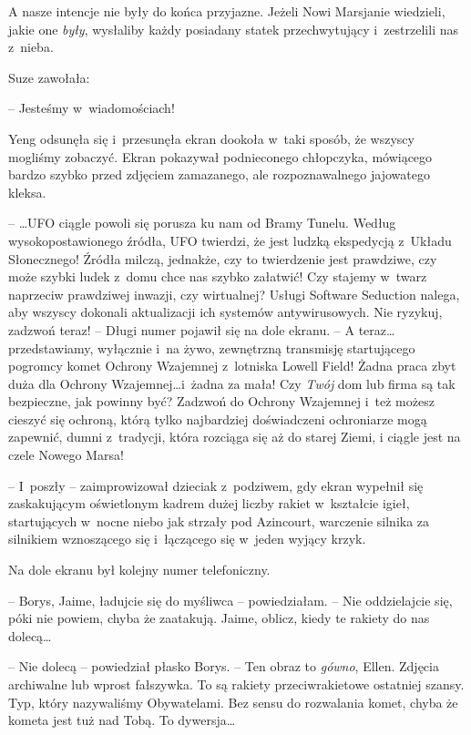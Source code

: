 \documentclass[oneside,polish,11pt,sfheadings]{mwbk}
\begin{document}
A nasze intencje nie były do końca przyjazne. Jeżeli Nowi Marsjanie
wiedzieli, jakie one \textit{były}, wysłaliby każdy posiadany statek
przechwytujący i~zestrzelili nas z~nieba.

Suze zawołała: 

-- Jesteśmy w~wiadomościach!

Yeng odsunęła się i~przesunęła ekran dookoła w~taki sposób, że wszyscy
mogliśmy zobaczyć. Ekran pokazywał podnieconego chłopczyka, mówiącego
bardzo szybko przed zdjęciem zamazanego, ale rozpoznawalnego jajowatego
kleksa.

-- \ldots  UFO ciągle powoli się porusza ku nam od Bramy Tunelu. Według
wysokopostawionego źródła, UFO twierdzi, że jest ludzką ekspedycją z~Układu Słonecznego! Źródła milczą, jednakże, czy to twierdzenie jest
prawdziwe, czy może szybki ludek z~domu chce nas szybko załatwić! Czy
stajemy w~twarz naprzeciw prawdziwej inwazji, czy wirtualnej? Usługi
Software Seduction nalega, aby wszyscy dokonali aktualizacji ich
systemów antywirusowych. Nie ryzykuj, zadzwoń teraz! -- Długi numer
pojawił się na dole ekranu. -- A teraz\ldots  przedstawiamy, wyłącznie i~na
żywo, zewnętrzną transmisję startującego pogromcy komet Ochrony
Wzajemnej z~lotniska Lowell Field! Żadna praca zbyt duża dla Ochrony
Wzajemnej\ldots  i~żadna za mała! Czy \textit{Twój }dom lub firma są tak
bezpieczne, jak powinny być? Zadzwoń do Ochrony Wzajemnej i~też możesz
cieszyć się ochroną, którą tylko najbardziej doświadczeni ochroniarze
mogą zapewnić, dumni z~tradycji, która rozciąga się aż do starej Ziemi,
i ciągle jest na czele Nowego Marsa!

-- I~poszły -- zaimprowizował dzieciak z~podziwem, gdy ekran wypełnił się
zaskakującym oświetlonym kadrem dużej liczby rakiet w~kształcie igieł,
startujących w~nocne niebo jak strzały pod Azincourt, warczenie silnika
za silnikiem wznoszącego się i~łączącego się w~jeden wyjący krzyk.

Na dole ekranu był kolejny numer telefoniczny.

-- Borys, Jaime, ładujcie się do myśliwca -- powiedziałam. -- Nie
oddzielajcie się, póki nie powiem, chyba że zaatakują. Jaime, oblicz,
kiedy te rakiety do nas dolecą\ldots 

-- Nie dolecą -- powiedział płasko Borys. -- Ten obraz to \textit{gówno},
Ellen. Zdjęcia archiwalne lub wprost fałszywka. To są rakiety
przeciwrakietowe ostatniej szansy. Typ, który nazywaliśmy Obywatelami.
Bez sensu do rozwalania komet, chyba że kometa jest tuż nad Tobą. To
dywersja\ldots 
\end{document}
